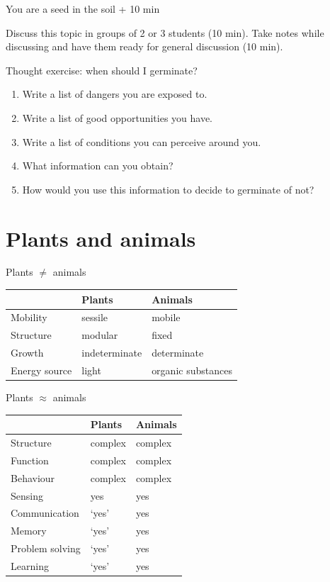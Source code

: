 \documentclass[10pt]{beamer}
\begin{document}
\begin{frame}{You are a seed in the soil  + 10 min}

Discuss this topic in groups of 2 or 3 students (10 min). Take notes while discussing and have them ready for general discussion (10 min).

\begin{alertblock}{Thought exercise: when should I germinate?}
\begin{enumerate}
  \item Write a list of dangers you are exposed to.
  \item Write a list of good opportunities you have.
  \item Write a list of conditions you can perceive around you.
  \item What information can you obtain?
  \item How would you use this information to decide to germinate of not?
\end{enumerate}
\end{alertblock}

\end{frame}

\section{Plants and animals}

\begin{frame}{Plants $\neq$ animals}

\center
\begin{tabular}{lll}
\hline
& \textbf{Plants} & \textbf{Animals}\\
\hline
Mobility & sessile & mobile\\
Structure & modular & fixed\\
Growth & indeterminate & determinate\\
Energy source & light & organic substances\\
\hline
\end{tabular}
\end{frame}

\begin{frame}{Plants $\approx$ animals}

\center
\begin{tabular}{lll}
\hline
& \textbf{Plants} & \textbf{Animals}\\
\hline
Structure & complex & complex\\
Function & complex  & complex\\
Behaviour & complex & complex\\
Sensing & yes & yes\\
Communication & `yes' & yes\\
Memory & `yes' & yes\\
Problem solving & `yes' & yes\\
Learning & `yes' & yes\\
\hline
\end{tabular}
\end{frame}
\end{document}
